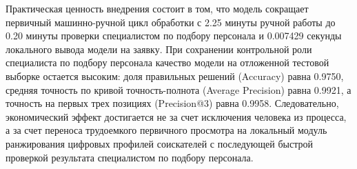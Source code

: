 \endgroup
Практическая ценность внедрения состоит в том, что модель сокращает первичный машинно-ручной цикл обработки с 2.25 минуты ручной работы до 0.20 минуты проверки специалистом по подбору персонала и 0.007429 секунды локального вывода модели на заявку. При сохранении контрольной роли специалиста по подбору персонала качество модели на отложенной тестовой выборке остается высоким: доля правильных решений (Accuracy) равна 0.9750, средняя точность по кривой точность-полнота (Average Precision) равна 0.9921, а точность на первых трех позициях (Precision@3) равна 0.9958. Следовательно, экономический эффект достигается не за счет исключения человека из процесса, а за счет переноса трудоемкого первичного просмотра на локальный модуль ранжирования цифровых профилей соискателей с последующей быстрой проверкой результата специалистом по подбору персонала.\par
